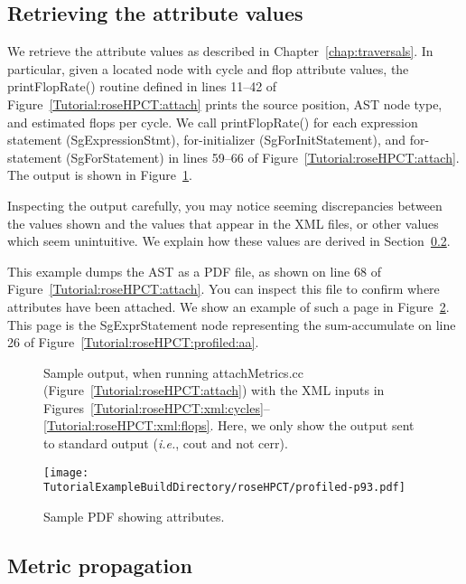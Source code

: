 \subsection{Retrieving the attribute values}

We retrieve the attribute values as described in
Chapter~\ref{chap:traversals}.  In particular, given a located node
with cycle and flop attribute values, the printFlopRate() routine
defined in lines 11--42 of Figure~\ref{Tutorial:roseHPCT:attach}
prints the source position, AST node type, and estimated flops per
cycle. We call printFlopRate() for each expression statement
(SgExpressionStmt), for-initializer (SgForInitStatement), and
for-statement (SgForStatement) in lines 59--66 of
Figure~\ref{Tutorial:roseHPCT:attach}. The output is shown in
Figure~\ref{Tutorial:roseHPCT:profiled:out}.

Inspecting the output carefully, you may notice seeming discrepancies
between the values shown and the values that appear in the XML files,
or other values which seem unintuitive. We explain how these values
are derived in Section~\ref{sec:rosehpct:metprop}.

This example dumps the AST as a PDF file, as shown on line 68 of
Figure~\ref{Tutorial:roseHPCT:attach}. You can inspect this file to
confirm where attributes have been attached. We show an example of
such a page in Figure~\ref{Tutorial:roseHPCT:pdf}. This page is the
SgExprStatement node representing the sum-accumulate on line 26 of
Figure~\ref{Tutorial:roseHPCT:profiled:aa}.

\begin{figure}[!ht]
{\mySmallFontSize
  
}
\caption{Sample output, when running attachMetrics.cc
(Figure~\ref{Tutorial:roseHPCT:attach}) with the XML inputs in
Figures~\ref{Tutorial:roseHPCT:xml:cycles}--\ref{Tutorial:roseHPCT:xml:flops}. Here,
we only show the output sent to standard output (\emph{i.e.}, cout and
not cerr).}
\label{Tutorial:roseHPCT:profiled:out}
\end{figure}

\begin{figure}[!hb]
\texttt{[image: \\TutorialExampleBuildDirectory/roseHPCT/profiled-p93.pdf]}
\caption{Sample PDF showing attributes.}
\label{Tutorial:roseHPCT:pdf}
\end{figure}

\subsection{Metric propagation}
\label{sec:rosehpct:metprop}

